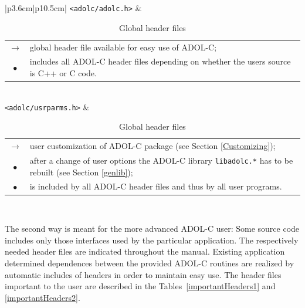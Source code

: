 \documentclass[11pt,twoside]{article}
\begin{document}
\begin{table}[h]
\center \small
\begin{tabular}{|p{3.6cm}|p{10.5cm}|}\hline
\verb=<adolc/adolc.h>= & 
\begin{tabular*}{10.5cm}{cp{9.5cm}}
  \boldmath $\rightarrow$ \unboldmath
                 & global header file available for easy use of ADOL-C; \\
  $\bullet$      & includes all ADOL-C header files depending on
                   whether the users source is C++ or C code.
\end{tabular*}
\\ \hline
\verb=<adolc/usrparms.h>= &
\begin{tabular*}{10.5cm}{cp{9.5cm}}
  \boldmath $\rightarrow$ \unboldmath
                 & user customization of ADOL-C package (see
                   Section \ref{Customizing}); \\
  $\bullet$      & after a change of
                   user options the ADOL-C library \verb=libadolc.*=
                   has to be rebuilt (see Section \ref{genlib}); \\
  $\bullet$      & is included by all ADOL-C header files and thus by all user
                   programs.
\end{tabular*} \\ \hline
\end{tabular}
\caption{Global header files}
\label{globalHeaders}
\end{table}  

The second way is meant for the more advanced ADOL-C user: Some source code
includes only those interfaces used by the particular application. 
The respectively needed header files are indicated
throughout the manual.
Existing application determined dependences between the provided 
ADOL-C routines are realized by automatic includes of headers in order 
to maintain easy use. The header files important to the user are described
in the Tables~\ref{importantHeaders1} and \ref{importantHeaders2}.
\end{document}
